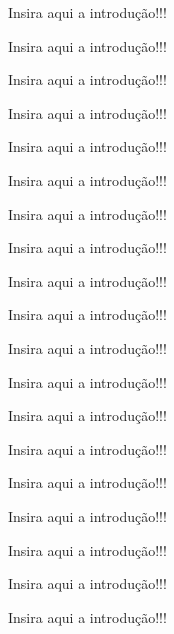 \documentclass[oneside,openright,12pt]{ufsm_2015} %
\begin{document}
{\par Insira aqui a introdução!!!

\par Insira aqui a introdução!!!

\par Insira aqui a introdução!!!

\par Insira aqui a introdução!!!

\par Insira aqui a introdução!!!

\par Insira aqui a introdução!!!

\par Insira aqui a introdução!!!

\par Insira aqui a introdução!!!

\par Insira aqui a introdução!!!

\par Insira aqui a introdução!!!

\par Insira aqui a introdução!!!

\par Insira aqui a introdução!!!

\par Insira aqui a introdução!!!

\par Insira aqui a introdução!!!

\par Insira aqui a introdução!!!

\par Insira aqui a introdução!!!

\par Insira aqui a introdução!!!

\par Insira aqui a introdução!!!

\par Insira aqui a introdução!!!


}%
\geraintro  %
\end{document}
